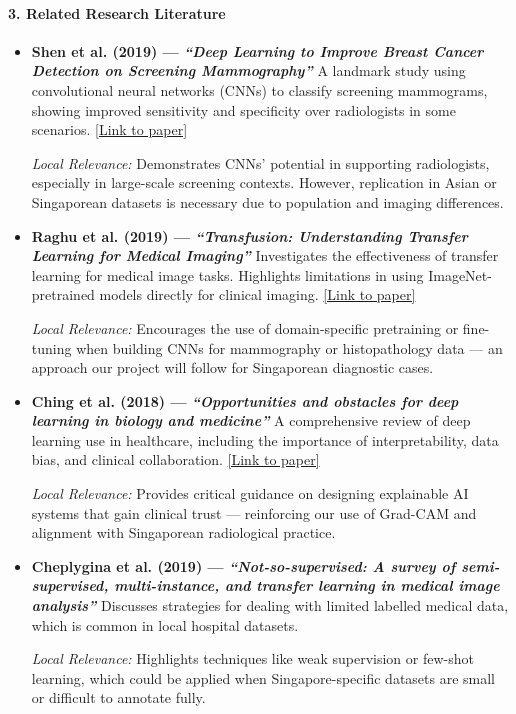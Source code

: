 \documentclass[12pt]{article}
\begin{document}
\paragraph{3. Related Research Literature}
\begin{itemize}

    \item \textbf{Shen et al. (2019) — \textit{“Deep Learning to Improve Breast Cancer Detection on Screening Mammography”}}
    A landmark study using convolutional neural networks (CNNs) to classify screening mammograms, showing improved sensitivity and specificity over radiologists in some scenarios.
    \href{https://pubs.rsna.org/doi/10.1148/radiol.2019182716}{[Link to paper]}
    
    \textit{Local Relevance:}
    Demonstrates CNNs’ potential in supporting radiologists, especially in large-scale screening contexts. However, replication in Asian or Singaporean datasets is necessary due to population and imaging differences.
    
    \item \textbf{Raghu et al. (2019) — \textit{“Transfusion: Understanding Transfer Learning for Medical Imaging”}}
    Investigates the effectiveness of transfer learning for medical image tasks. Highlights limitations in using ImageNet-pretrained models directly for clinical imaging.
    \href{https://arxiv.org/abs/1902.07208}{[Link to paper]}
    
    \textit{Local Relevance:}
    Encourages the use of domain-specific pretraining or fine-tuning when building CNNs for mammography or histopathology data — an approach our project will follow for Singaporean diagnostic cases.
    
    \item \textbf{Ching et al. (2018) — \textit{“Opportunities and obstacles for deep learning in biology and medicine”}}
    A comprehensive review of deep learning use in healthcare, including the importance of interpretability, data bias, and clinical collaboration.
    \href{https://www.nature.com/articles/s41591-018-0316-z}{[Link to paper]}
    
    \textit{Local Relevance:}
    Provides critical guidance on designing explainable AI systems that gain clinical trust — reinforcing our use of Grad-CAM and alignment with Singaporean radiological practice.
    
    \item \textbf{Cheplygina et al. (2019) — \textit{“Not-so-supervised: A survey of semi-supervised, multi-instance, and transfer learning in medical image analysis”}}
    Discusses strategies for dealing with limited labelled medical data, which is common in local hospital datasets.
    
    \textit{Local Relevance:}
    Highlights techniques like weak supervision or few-shot learning, which could be applied when Singapore-specific datasets are small or difficult to annotate fully.
    
    \end{itemize}
\end{document}
